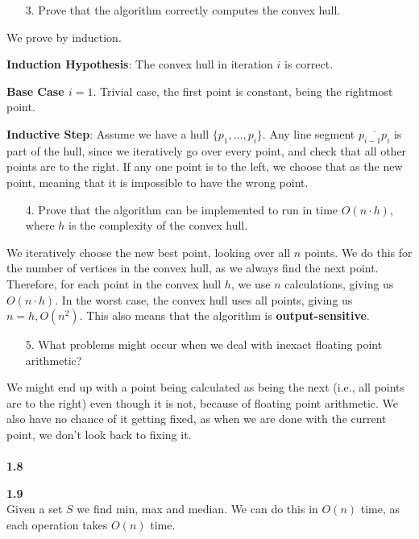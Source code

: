 \begin{enumerate}
	\item[3.] Prove that the algorithm correctly computes the convex hull.
\end{enumerate}

We prove by induction.

\textbf{Induction Hypothesis}: The convex hull in iteration $i$ is correct.

\textbf{Base Case $i = 1$}. Trivial case, the first point is constant, being the rightmost point.

\textbf{Inductive Step}: Assume we have a hull $\{p_{1}, \ldots, p_{i}\}$. Any line segment $\overline{p_{i-1}p_i}$ is part of the hull, since we iteratively go over every point, and check that all other points are to the right. If any one point is to the left, we choose that as the new point, meaning that it is impossible to have the wrong point.

\begin{enumerate}
	\item[4.] Prove that the algorithm can be implemented to run in time $O(n \cdot h)$, where $h$ is the complexity of the convex hull.
\end{enumerate}

We iteratively choose the new best point, looking over all $n$ points. We do this for the number of vertices in the convex hull, as we always find the next point. Therefore, for each point in the convex hull $h$, we use $n$ calculations, giving us $O(n \cdot h)$. In the worst case, the convex hull uses all points, giving us $n = h, O(n^2)$. This also means that the algorithm is \textbf{output-sensitive}.

\begin{enumerate}
	\item[5.] What problems might occur when we deal with inexact floating point arithmetic?
\end{enumerate}

We might end up with a point being calculated as being the next (i.e., all points are to the right) even though it is not, because of floating point arithmetic. We also have no chance of it getting fixed, as when we are done with the current point, we don't look back to fixing it.
\\\\
\noindent
\textbf{1.8}\\
\noindent


\noindent
\textbf{1.9}\\
\noindent
Given a set $S$ we find min, max and median. We can do this in $O(n)$ time, as each operation takes $O(n)$ time.

